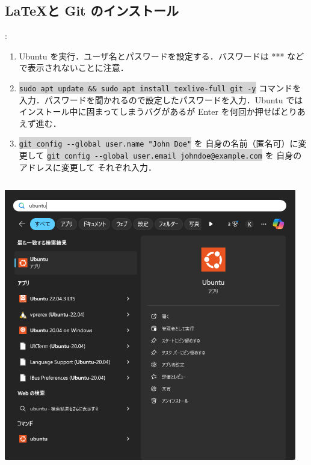 \documentclass[aspectratio=169,dvipdfmx,cjk]{beamer}
\newcommand{\cmdline}[1]{
    \colorbox{lightgray}{\lstinline[style=command]{#1}}
}
\newcommand{\blue}[1]{ {\color{blue} #1} }
\begin{document}
\subsection{\LaTeX と Git のインストール}
\begin{frame}{\insertsection \thesubsection: \insertsubsection}
  \begin{enumerate}
    \item Ubuntu を実行．ユーザ名とパスワードを設定する．{\tiny バスワードは *** などで表示されないことに注意．}
    \item \cmdline{sudo apt update && sudo apt install texlive-full git -y} コマンドを入力．パスワードを聞かれるので設定したパスワードを入力．Ubuntu ではインストール中に固まってしまうバグがあるが Enter を何回か押せばとりあえず進む\cite{LaTeXBug}．
    \item \cmdline{git config --global user.name "John Doe"} を\blue{自身の名前（匿名可）に変更して} \cmdline{git config --global user.email johndoe@example.com} を\blue{自身のアドレスに変更して}それぞれ入力\cite{GitBook}．
  \end{enumerate}
  \begin{columns}
    \begin{column}{0.2\textwidth}
        \includegraphics[width=1.0\linewidth]{fig/start-ubuntu.png}
    \end{column}
    \begin{column}{0.3\textwidth}

\end{column}
\end{columns}
\end{frame}
\end{document}
